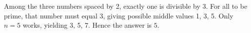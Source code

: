 Among the three numbers spaced by 2, exactly one is divisible by 3. For all to be prime, that number must equal 3, giving possible middle values 1, 3, 5. Only $ n=5 $ works, yielding 3, 5, 7. Hence the answer is $\boxed5 $.

